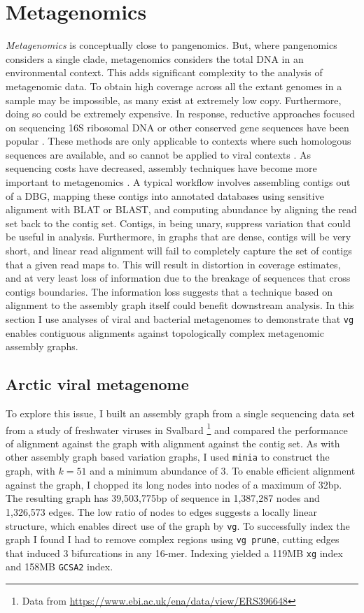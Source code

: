 \section{Metagenomics}

\emph{Metagenomics} is conceptually close to pangenomics.
But, where pangenomics considers a single clade, metagenomics considers the total DNA in an environmental context.
This adds significant complexity to the analysis of metagenomic data.
To obtain high coverage across all the extant genomes in a sample may be impossible, as many exist at extremely low copy.
Furthermore, doing so could be extremely expensive.
In response, reductive approaches focused on sequencing 16S ribosomal DNA or other conserved gene sequences have been popular \cite{tringe2005comparative}.
These methods are only applicable to contexts where such homologous sequences are available, and so cannot be applied to viral contexts \cite{edwards2005viral}.
As sequencing costs have decreased, assembly techniques have become more important to metagenomics \cite{nurk2017metaspades}.
A typical workflow involves assembling contigs out of a DBG, mapping these contigs into annotated databases using sensitive alignment with BLAT or BLAST, and computing abundance by aligning the read set back to the contig set.
Contigs, in being unary, suppress variation that could be useful in analysis.
Furthermore, in graphs that are dense, contigs will be very short, and linear read alignment will fail to completely capture the set of contigs that a given read maps to.
This will result in distortion in coverage estimates, and at very least loss of information due to the breakage of sequences that cross contigs boundaries.
The information loss suggests that a technique based on alignment to the assembly graph itself could benefit downstream analysis.
In this section I use analyses of viral and bacterial metagenomes to demonstrate that {\tt vg} enables contiguous alignments against topologically complex metagenomic assembly graphs.

\subsection{Arctic viral metagenome}

To explore this issue, I built an assembly graph from a single sequencing data set from a study of freshwater viruses in Svalbard \cite{de2015biodiversity}\footnote{Data from \url{https://www.ebi.ac.uk/ena/data/view/ERS396648}} and compared the performance of alignment against the graph with alignment against the contig set.
As with other assembly graph based variation graphs, I used {\tt minia} to construct the graph, with $k=51$ and a minimum abundance of 3.
To enable efficient alignment against the graph, I chopped its long nodes into nodes of a maximum of 32bp.
The resulting graph has 39,503,775bp of sequence in 1,387,287 nodes and 1,326,573 edges.
The low ratio of nodes to edges suggests a locally linear structure, which enables direct use of the graph by {\tt vg}.
To successfully index the graph I found I had to remove complex regions using {\tt vg prune}, cutting edges that induced 3 bifurcations in any 16-mer.
Indexing yielded a 119MB {\tt xg} index and 158MB {\tt GCSA2} index.

